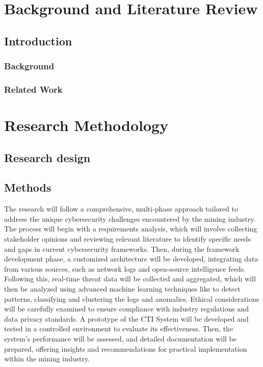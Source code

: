 \documentclass[a4paper,twoside,12pt]{report}
\begin{document}

\chapter{Background and Literature Review}
\section{Introduction}
\subsection{Background}
\subsection{Related Work}
\chapter{Research Methodology}
\section{Research design}
\section{Methods}The research will follow a comprehensive, multi-phase approach tailored to address the
unique cybersecurity challenges encountered by the mining industry. The process will begin
with a requirements analysis, which will involve collecting stakeholder opinions and reviewing
relevant literature to identify specific needs and gaps in current cybersecurity frameworks.
Then, during the framework development phase, a customized architecture will be developed,
integrating data from various sources, such as network logs and open-source intelligence
feeds. Following this, real-time threat data will be collected and aggregated, which will then
be analyzed using advanced machine learning techniques like to detect patterns, classifying
and clustering the logs and anomalies. Ethical considerations will be carefully examined to
ensure compliance with industry regulations and data privacy standards. A prototype of the
CTI System will be developed and tested in a controlled environment to evaluate its
effectiveness. Then, the system’s performance will be assessed, and detailed documentation
will be prepared, offering insights and recommendations for practical implementation within
the mining industry.
\end{document}
